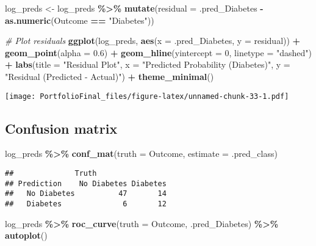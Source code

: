 \documentclass[
]{article}
\newenvironment{Shaded}{\begin{snugshade}}{\end{snugshade}}
\newcommand{\AttributeTok}[1]{\textcolor[rgb]{0.13,0.29,0.53}{#1}}
\newcommand{\CommentTok}[1]{\textcolor[rgb]{0.56,0.35,0.01}{\textit{#1}}}
\newcommand{\DecValTok}[1]{\textcolor[rgb]{0.00,0.00,0.81}{#1}}
\newcommand{\FloatTok}[1]{\textcolor[rgb]{0.00,0.00,0.81}{#1}}
\newcommand{\FunctionTok}[1]{\textcolor[rgb]{0.13,0.29,0.53}{\textbf{#1}}}
\newcommand{\NormalTok}[1]{#1}
\newcommand{\OtherTok}[1]{\textcolor[rgb]{0.56,0.35,0.01}{#1}}
\newcommand{\SpecialCharTok}[1]{\textcolor[rgb]{0.81,0.36,0.00}{\textbf{#1}}}
\newcommand{\StringTok}[1]{\textcolor[rgb]{0.31,0.60,0.02}{#1}}
\begin{document}
\begin{Shaded}
\begin{Highlighting}[]
\NormalTok{log\_preds }\OtherTok{\textless{}{-}}\NormalTok{ log\_preds }\SpecialCharTok{\%\textgreater{}\%}
  \FunctionTok{mutate}\NormalTok{(}\AttributeTok{residual =}\NormalTok{ .pred\_Diabetes }\SpecialCharTok{{-}} \FunctionTok{as.numeric}\NormalTok{(Outcome }\SpecialCharTok{==} \StringTok{"Diabetes"}\NormalTok{))}

\CommentTok{\# Plot residuals}
\FunctionTok{ggplot}\NormalTok{(log\_preds, }\FunctionTok{aes}\NormalTok{(}\AttributeTok{x =}\NormalTok{ .pred\_Diabetes, }\AttributeTok{y =}\NormalTok{ residual)) }\SpecialCharTok{+}
  \FunctionTok{geom\_point}\NormalTok{(}\AttributeTok{alpha =} \FloatTok{0.6}\NormalTok{) }\SpecialCharTok{+}
  \FunctionTok{geom\_hline}\NormalTok{(}\AttributeTok{yintercept =} \DecValTok{0}\NormalTok{, }\AttributeTok{linetype =} \StringTok{"dashed"}\NormalTok{) }\SpecialCharTok{+}
  \FunctionTok{labs}\NormalTok{(}\AttributeTok{title =} \StringTok{"Residual Plot"}\NormalTok{,}
       \AttributeTok{x =} \StringTok{"Predicted Probability (Diabetes)"}\NormalTok{,}
       \AttributeTok{y =} \StringTok{"Residual (Predicted {-} Actual)"}\NormalTok{) }\SpecialCharTok{+}
  \FunctionTok{theme\_minimal}\NormalTok{()}
\end{Highlighting}
\end{Shaded}

\texttt{[image: PortfolioFinal\_files/figure-latex/unnamed-chunk-33-1.pdf]}

\subsection{Confusion matrix}\label{confusion-matrix}

\begin{Shaded}
\begin{Highlighting}[]
\NormalTok{log\_preds }\SpecialCharTok{\%\textgreater{}\%}
  \FunctionTok{conf\_mat}\NormalTok{(}\AttributeTok{truth =}\NormalTok{ Outcome, }\AttributeTok{estimate =}\NormalTok{ .pred\_class)}
\end{Highlighting}
\end{Shaded}

\begin{verbatim}
##              Truth
## Prediction    No Diabetes Diabetes
##   No Diabetes          47       14
##   Diabetes              6       12
\end{verbatim}

\begin{Shaded}
\begin{Highlighting}[]
\NormalTok{log\_preds }\SpecialCharTok{\%\textgreater{}\%}
  \FunctionTok{roc\_curve}\NormalTok{(}\AttributeTok{truth =}\NormalTok{ Outcome, .pred\_Diabetes) }\SpecialCharTok{\%\textgreater{}\%}
  \FunctionTok{autoplot}\NormalTok{()}
\end{Highlighting}
\end{Shaded}
\end{document}
